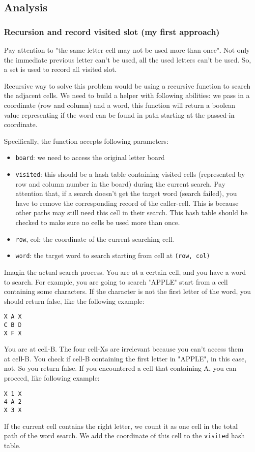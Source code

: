 \documentclass[12pt]{article}
\begin{document}
\subsection{Analysis}
\label{sec:org4445292}
\subsubsection{Recursion and record visited slot (my first approach)}
\label{sec:orgc16005d}
Pay attention to "the same letter cell may not be used more than once". Not only the immediate previous letter can't be used, all the used letters can't be used. So, a set is used to record all visited slot.

Recursive way to solve this problem would be using a recursive function to search the adjacent cells. We need to build a helper with following abilities: we pass in a coordinate (row and column) and a word, this function will return a boolean value representing if the word can be found in path starting at the passed-in coordinate.

Specifically, the function accepts following parameters:
\begin{itemize}
\item \texttt{board}: we need to access the original letter board
\item \texttt{visited}: this should be a hash table containing visited cells (represented by row and column number in the board) during the current search. Pay attention that, if a search doesn't get the target word (search failed), you have to remove the corresponding record of the caller-cell. This is because other paths may still need this cell in their search. This hash table should be checked to make sure no cells be used more than once.
\item \texttt{row}, col: the coordinate of the current searching cell.
\item \texttt{word}: the target word to search starting from cell at \texttt{(row, col)}
\end{itemize}

Imagin the actual search process. You are at a certain cell, and you have a word to search. For example, you are going to search "APPLE" start from a cell containing some characters. If the character is not the first letter of the word, you should return false, like the following example:
\begin{verbatim}
X A X
C B D
X F X
\end{verbatim}
You are at cell-B. The four cell-Xs are irrelevant because you can't access them at cell-B. You check if cell-B containing the first letter in "APPLE", in this case, not. So you return false. If you encountered a cell that containing A, you can proceed, like following example:
\begin{verbatim}
X 1 X
4 A 2
X 3 X
\end{verbatim}
If the current cell contains the right letter, we count it as one cell in the total path of the word search. We add the coordinate of this cell to the \texttt{visited} hash table. 
\end{document}
